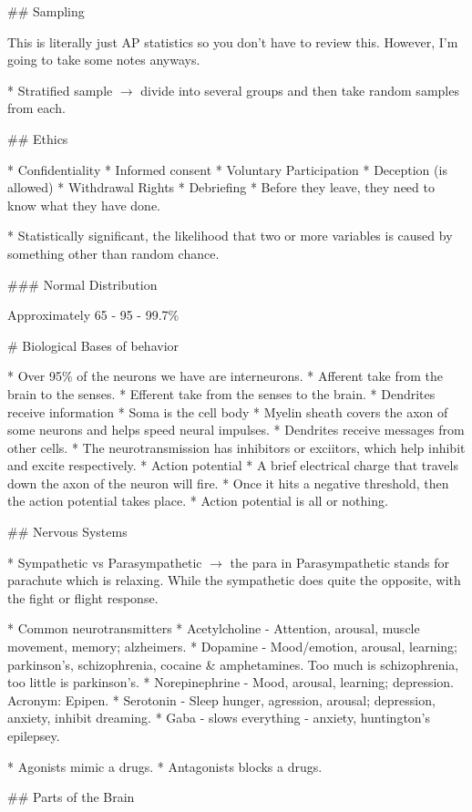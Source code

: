 \documentclass{article}
\begin{document}
\begin{markdown}
## Sampling

This is literally just AP statistics so you don't have to review this. However, I'm going to take some notes anyways.

* Stratified sample $\rightarrow$ divide into several groups and then take random samples from each.

## Ethics

* Confidentiality
* Informed consent
* Voluntary Participation
* Deception (is allowed)
* Withdrawal Rights
* Debriefing
	* Before they leave, they need to know what they have done.

* Statistically significant, the likelihood that two or more variables is caused by something other than random chance.

### Normal Distribution

Approximately 65 - 95 - 99.7\%

# Biological Bases of behavior

* Over 95\% of the neurons we have are interneurons.
* Afferent take from the brain to the senses.
* Efferent take from the senses to the brain.
* Dendrites receive information
* Soma is the cell body
* Myelin sheath covers the axon of some neurons and helps speed neural impulses.
* Dendrites receive messages from other cells.
* The neurotransmission has inhibitors or exciitors, which help inhibit and excite respectively.
* Action potential
	* A brief electrical charge that travels down the axon of the neuron will fire.
	* Once it hits a negative threshold, then the action potential takes place.
	* Action potential is all or nothing.

## Nervous Systems

* Sympathetic vs Parasympathetic $\rightarrow$ the para in Parasympathetic stands for parachute which is relaxing. While the sympathetic does quite the opposite, with the fight or flight response.

* Common neurotransmitters
	* Acetylcholine - Attention, arousal, muscle movement, memory; alzheimers.
	* Dopamine - Mood/emotion, arousal, learning; parkinson's, schizophrenia, cocaine & amphetamines. Too much is schizophrenia, too little is parkinson's.
	* Norepinephrine - Mood, arousal, learning; depression. Acronym: Epipen.
	* Serotonin - Sleep hunger, agression, arousal; depression, anxiety, inhibit dreaming.
	* Gaba - slows everything - anxiety, huntington's epilepsey.

* Agonists mimic a drugs.
* Antagonists blocks a drugs.

## Parts of the Brain


\end{markdown}
\end{document}
